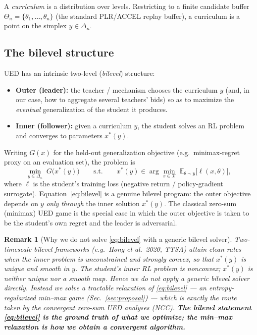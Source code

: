 \documentclass[11pt]{article}
\newtheorem{remark}{Remark}
\newcommand{\expect}{\mathbb{E}}
\newcommand{\simplex}{\Delta}
\newcommand{\level}{\theta}        %
\newcommand{\levelset}{\Theta}     %
\newcommand{\param}{x}             %
\newcommand{\paramset}{\mathcal{X}}
\newcommand{\dist}{y}              %
\begin{document}
A \emph{curriculum} is a distribution over levels. Restricting to a finite candidate buffer $\levelset_n=\{\level_1,\dots,\level_n\}$ (the standard PLR/ACCEL replay buffer), a curriculum is a point on the simplex $\dist \in \simplex_n$.

\subsection{The bilevel structure}
UED has an intrinsic two-level (\emph{bilevel}) structure:
\begin{itemize}[topsep=2pt,itemsep=1pt]
  \item \textbf{Outer (leader):} the teacher / mechanism chooses the curriculum $\dist$ (and, in our case, how to aggregate several teachers' bids) so as to maximize the \emph{eventual} generalization of the student it produces.
  \item \textbf{Inner (follower):} given a curriculum $\dist$, the student solves an RL problem and converges to parameters $\param^{*}(\dist)$.
\end{itemize}
Writing $G(\param)$ for the held-out generalization objective (e.g.\ minimax-regret proxy on an evaluation set), the problem is
\begin{equation}
  \min_{\dist \in \simplex_n}\; G\big(\param^{*}(\dist)\big)
  \qquad \text{s.t.}\qquad
  \param^{*}(\dist) \in \arg\min_{\param \in \paramset}\; \expect_{\level \sim \dist}\big[\ell(\param,\level)\big],
  \label{eq:bilevel}
\end{equation}
where $\ell$ is the student's training loss (negative return / policy-gradient surrogate). Equation~\eqref{eq:bilevel} is a genuine bilevel program: the outer objective depends on $\dist$ \emph{only through} the inner solution $\param^{*}(\dist)$. The classical zero-sum (minimax) UED game is the special case in which the outer objective is taken to be the student's own regret and the leader is adversarial.

\begin{remark}[Why we do not solve \eqref{eq:bilevel} with a generic bilevel solver]
\label{rem:why-not-bilevel}
Two-timescale bilevel frameworks (e.g.\ Hong et al.\ 2020, TTSA) attain clean rates \emph{when the inner problem is unconstrained and strongly convex}, so that $\param^{*}(\dist)$ is unique and smooth in $\dist$. The student's inner RL problem is \emph{nonconvex}; $\param^{*}(\dist)$ is neither unique nor a smooth map. Hence we do not apply a generic bilevel solver directly. Instead we solve a \emph{tractable relaxation} of \eqref{eq:bilevel} --- an entropy-regularized min--max game (Sec.~\ref{sec:proposal}) --- which is exactly the route taken by the convergent zero-sum UED analyses (NCC). \textbf{The bilevel statement \eqref{eq:bilevel} is the ground truth of what we optimize; the min--max relaxation is how we obtain a convergent algorithm.}
\end{remark}
\end{document}
